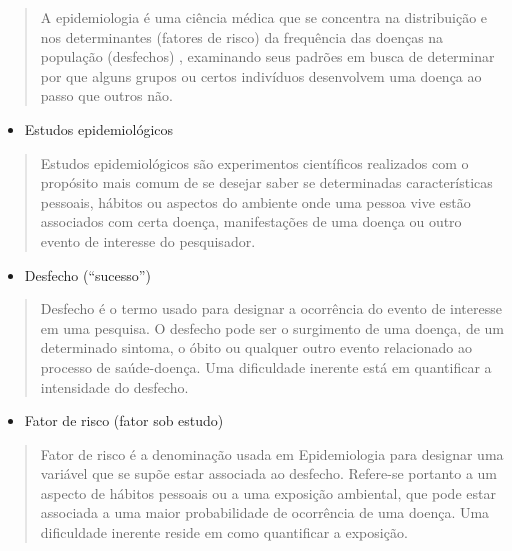 \documentclass[
]{book}
\providecommand{\tightlist}{%
  \setlength{\itemsep}{0pt}\setlength{\parskip}{0pt}}
\begin{document}
\hfill\break

\begin{quote}
A epidemiologia é uma ciência médica que se concentra na distribuição e nos determinantes (fatores de risco) da frequência das doenças na população (desfechos) , examinando seus padrões em busca de determinar por que alguns grupos ou certos indivíduos desenvolvem uma doença ao passo que outros não.
\end{quote}

\hfill\break

\begin{itemize}
\tightlist
\item
  Estudos epidemiológicos
\end{itemize}

\hfill\break

\begin{quote}
Estudos epidemiológicos são experimentos científicos realizados com o propósito mais comum de se desejar saber se determinadas características pessoais, hábitos ou aspectos do ambiente onde uma pessoa vive estão associados com certa doença, manifestações de uma doença ou outro evento de interesse do pesquisador.
\end{quote}

\hfill\break

\begin{itemize}
\tightlist
\item
  Desfecho (``sucesso'')
\end{itemize}

\hfill\break

\begin{quote}
Desfecho é o termo usado para designar a ocorrência do evento de interesse em uma pesquisa. O desfecho pode ser o surgimento de uma doença, de um determinado sintoma, o óbito ou qualquer outro evento relacionado ao processo de saúde-doença. Uma dificuldade inerente está em quantificar a intensidade do desfecho.
\end{quote}

\hfill\break

\begin{itemize}
\tightlist
\item
  Fator de risco (fator sob estudo)
\end{itemize}

\hfill\break

\begin{quote}
Fator de risco é a denominação usada em Epidemiologia para designar uma variável que se supõe estar associada ao desfecho. Refere-se portanto a um aspecto de hábitos pessoais ou a uma exposição ambiental, que pode estar associada a uma maior probabilidade de ocorrência de uma doença. Uma dificuldade inerente reside em como quantificar a exposição.
\end{quote}
\end{document}

